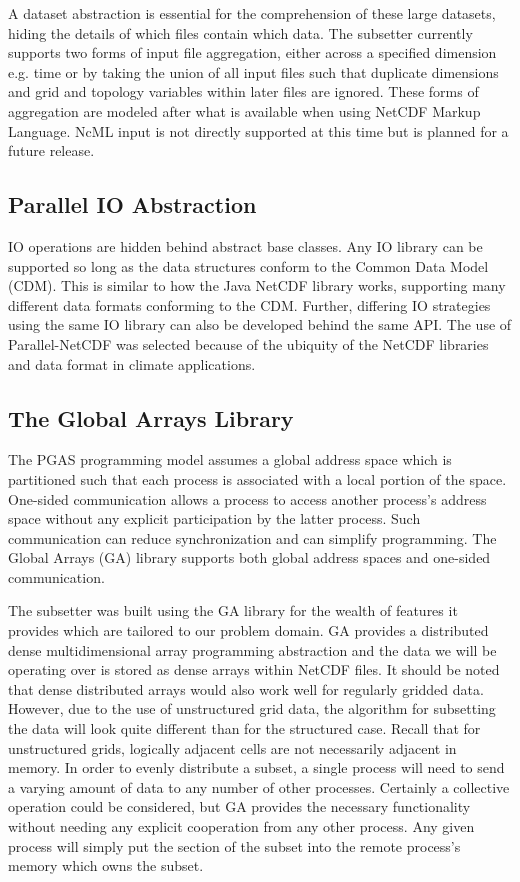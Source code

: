 A dataset abstraction is essential for the comprehension of these large
datasets, hiding the details of which files contain which data.  The subsetter
currently supports two forms of input file aggregation, either across a
specified dimension e.g. time or by taking the union of all input files such
that duplicate dimensions and grid and topology variables within later files
are ignored.  These forms of aggregation are modeled after what is available
when using NetCDF Markup Language\cite{NcML}.  NcML input is not directly
supported at this time but is planned for a future release. 

\subsection{Parallel IO Abstraction}

IO operations are hidden behind abstract base classes.  Any IO library can be
supported so long as the data structures conform to the Common Data Model
(CDM)\cite{CDM}.  This is similar to how the Java NetCDF library works,
supporting many different data formats conforming to the CDM\cite{JavaNetCDF}.
Further, differing IO strategies using the same IO library can also be
developed behind the same API.  The use of Parallel-NetCDF was selected
because of the ubiquity of the NetCDF libraries and data format in climate
applications.

\subsection{The Global Arrays Library}

The PGAS programming model assumes a global address space which is partitioned
such that each process is associated with a local portion of the space.
One-sided communication allows a process to access another process's address
space without any explicit participation by the latter process.  Such
communication can reduce synchronization and can simplify programming.  The
Global Arrays (GA) library supports both global address spaces and one-sided
communication.

The subsetter was built using the GA library for the wealth of features it
provides which are tailored to our problem domain.  GA provides a distributed
dense multidimensional array programming abstraction and the data we will be
operating over is stored as dense arrays within NetCDF files.  It should be
noted that dense distributed arrays would also work well for regularly gridded
data.  However, due to the use of unstructured grid data, the algorithm for
subsetting the data will look quite different than for the structured case.
Recall that for unstructured grids, logically adjacent cells are not
necessarily adjacent in memory.  In order to evenly distribute a subset, a
single process will need to send a varying amount of data to any number of
other processes.  Certainly a collective operation could be considered, but GA
provides the necessary functionality without needing any explicit cooperation
from any other process.  Any given process will simply put the section of the
subset into the remote process's memory which owns the subset.

